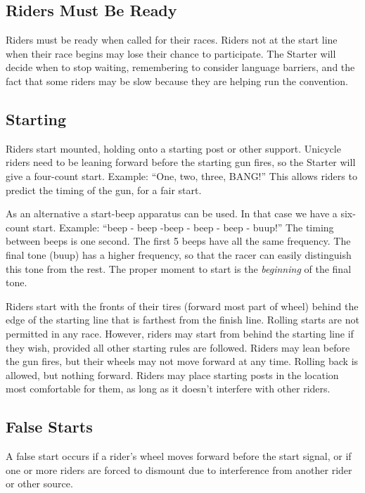 \subsection{Riders Must Be Ready}

Riders must be ready when called for their races.
Riders not at the start line when their race begins may lose their chance to participate.
The Starter will decide when to stop waiting, remembering to consider language barriers, and the fact that some riders may be slow because they are helping run the convention.

\subsection{Starting}

Riders start mounted, holding onto a starting post or other support.
Unicycle riders need to be leaning forward before the starting gun fires, so the Starter will give a four-count start.
Example: ``One, two, three, BANG!''
This allows riders to predict the timing of the gun, for a fair start.

As an alternative a start-beep apparatus can be used.
In that case we have a six-count start.
Example: ``beep - beep -beep - beep - beep - buup!''
The timing between beeps is one second.
The first 5 beeps have all the same frequency.
The final tone (buup) has a higher frequency, so that the racer can easily distinguish this tone from the rest.
The proper moment to start is the \textit{beginning} of the final tone.

Riders start with the fronts of their tires (forward most part of wheel) behind the edge of the starting line that is farthest from the finish line.
Rolling starts are not permitted in any race.
However, riders may start from behind the starting line if they wish, provided all other starting rules are followed.
Riders may lean before the gun fires, but their wheels may not move forward at any time.
Rolling back is allowed, but nothing forward.
Riders may place starting posts in the location most comfortable for them, as long as it doesn't interfere with other riders.

\subsection{False Starts}

A false start occurs if a rider's wheel moves forward before the start signal, or if one or more riders are forced to dismount due to interference from another rider or other source.


